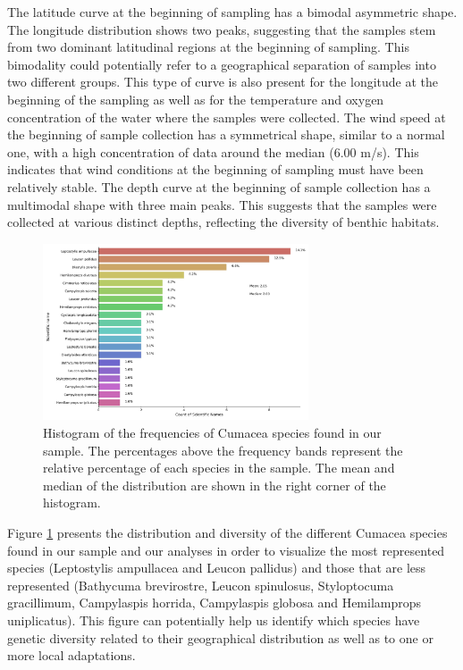 The latitude curve at the beginning of sampling has a bimodal asymmetric shape. The longitude distribution shows two peaks, suggesting that the samples stem from two dominant latitudinal regions at the beginning of sampling. This bimodality could potentially refer to a geographical separation of samples into two different groups. This type of curve is also present for the longitude at the beginning of the sampling as well as for the temperature and oxygen concentration of the water where the samples were collected. The wind speed at the beginning of sample collection has a symmetrical shape, similar to a normal one, with a high concentration of data around the median (6.00 m/s). This indicates that wind conditions at the beginning of sampling must have been relatively stable. The depth curve at the beginning of sample collection has a multimodal shape with three main peaks. This suggests that the samples were collected at various distinct depths, reflecting the diversity of benthic habitats.

\begin{figure}[]
    \centering
    \includegraphics[width=0.7\textwidth]{figure2.jpg}
    \caption{Histogram of the frequencies of Cumacea species found in our sample. The percentages above the frequency bands represent the relative percentage of each species in the sample. The mean and median of the distribution are shown in the right corner of the histogram. \label{fig:fig2}}
\end{figure}

Figure \ref{fig:fig2} presents the distribution and diversity of the different Cumacea species found in our sample and our analyses in order to visualize the most represented species (Leptostylis ampullacea and Leucon pallidus) and those that are less represented (Bathycuma brevirostre, Leucon spinulosus, Styloptocuma gracillimum, Campylaspis horrida, Campylaspis globosa and Hemilamprops uniplicatus). This figure can potentially help us identify which species have genetic diversity related to their geographical distribution as well as to one or more local adaptations.

